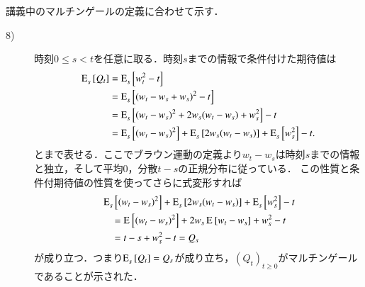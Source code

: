 \begin{prf}
講義中のマルチンゲールの定義に合わせて示す．
\begin{description}
	\item[8)] 時刻$0 \leq s < t$を任意に取る．時刻$s$までの情報で条件付けた期待値は
		\begin{align}
			\Exp{Q_t}{s}{} &= \Exp{w_t^2 -t}{s}{} \\
			&= \Exp{(w_t - w_s + w_s)^2 -t}{s}{} \\
			&= \Exp{(w_t - w_s)^2 + 2w_s(w_t - w_s) + w_s^2}{s}{} - t \\
			&= \Exp{(w_t - w_s)^2}{s}{} + \Exp{2w_s(w_t - w_s)}{s}{} + \Exp{w_s^2}{s}{} - t.
		\end{align}
		とまで表せる．ここでブラウン運動の定義より$w_t - w_s$は時刻$s$までの情報と独立，そして平均0，分散$t-s$の正規分布に従っている．
		この性質と条件付期待値の性質を使ってさらに式変形すれば
		\begin{align}
			&\Exp{(w_t - w_s)^2}{s}{} + \Exp{2w_s(w_t - w_s)}{s}{} + \Exp{w_s^2}{s}{} - t \\
			&\quad= \Exp{(w_t - w_s)^2}{}{} + 2w_s\Exp{w_t - w_s}{}{} + w_s^2 - t \\
			&\quad= t-s + w_s^2 - t = Q_s
		\end{align}
		が成り立つ．つまり$\Exp{Q_t}{s}{} = Q_s$が成り立ち，$(Q_t)_{t \geq 0}$がマルチンゲールであることが示された．
	

\end{description}
\end{prf}
